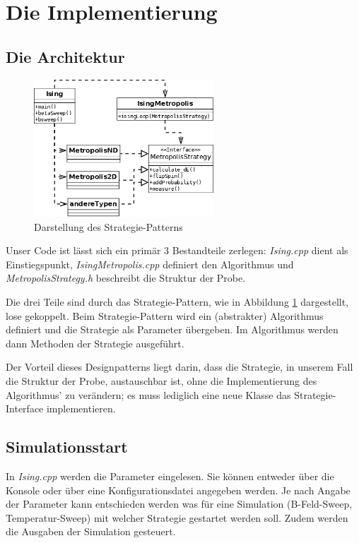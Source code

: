 \section{Die Implementierung}

\subsection{Die Architektur}
\begin{figure}
  \includegraphics[width=0.6\textwidth]{bilder/impl/strategy.png}
  \caption{Darstellung des Strategie-Patterns \label{strategyPattern}}
\end{figure}
Unser Code ist lässt sich ein primär 3 Bestandteile zerlegen: \textit{Ising.cpp} dient als Einstiegspunkt, \textit{IsingMetropolis.cpp} definiert den Algorithmus und \textit{MetropolisStrategy.h} beschreibt die Struktur der Probe.

Die drei Teile sind durch das Strategie-Pattern, wie in Abbildung \ref{strategyPattern} dargestellt, lose gekoppelt. 
Beim Strategie-Pattern wird ein (abstrakter) Algorithmus definiert und die Strategie als Parameter übergeben. Im Algorithmus werden dann Methoden der Strategie ausgeführt. 

Der Vorteil dieses Designpatterns liegt darin, dass die Strategie, in unserem Fall die Struktur der Probe, austauschbar ist, ohne die Implementierung des Algorithmus' zu verändern; es muss lediglich eine neue Klasse das Strategie-Interface implementieren.

\subsection{Simulationsstart}
In \textit{Ising.cpp} werden die Parameter eingelesen. Sie können entweder über die Konsole oder über eine Konfigurationsdatei angegeben werden. Je nach Angabe der Parameter kann entschieden werden was für eine Simulation (B-Feld-Sweep, Temperatur-Sweep) mit welcher Strategie gestartet werden soll. Zudem werden die Ausgaben der Simulation gesteuert.

